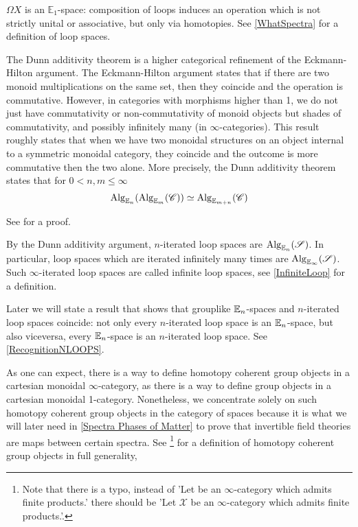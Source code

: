 \begin{ex}
    $\Omega X$ is an $\mathbb{E}_1$-space: composition of loops induces an operation which is not
    strictly unital or associative, but only via homotopies. See
    \ref{WhatSpectra} for a definition of loop spaces.
\end{ex}
\begin{thm}\label{DunnAdds}
    The Dunn additivity theorem is a higher categorical refinement of the Eckmann-Hilton argument.
    The Eckmann-Hilton argument states that if there are two monoid multiplications on the same set, then
    they coincide and the operation is commutative. However, in categories with morphisms higher than 1,
    we do not just have commutativity or non-commutativity of monoid objects but
     shades of
    commutativity, and possibly infinitely many (in $\infty$-categories). This result roughly states that
     when we have two monoidal structures on an object
    internal to a symmetric monoidal category, they coincide and the outcome is more commutative then
     the two alone. More
     precisely, the Dunn additivity theorem states
    that for $0< n,m\leq \infty$
    $$\operatorname{Alg}_{\mathbb{E}_n}(\operatorname{Alg}_{\mathbb{E}_m}(\mathscr{C}))\simeq \operatorname{Alg}_{\mathbb{E}_{m+n}}(\mathscr{C})$$
\end{thm}
See \cite[5.1.2.2]{Luriealgebra} for a proof.
\begin{ex}
    By the Dunn additivity argument, $n$-iterated loop spaces are $\operatorname{Alg}_{\mathbb{E}_n}(\mathscr{S})$.
    In particular, loop spaces which are iterated infinitely many times are 
    $\operatorname{Alg}_{\mathbb{E}_\infty}(\mathscr{S})$. Such $\infty$-iterated loop spaces are called infinite loop spaces, 
    see \ref{InfiniteLoop} for a definition.
    
  Later we will state a result that shows that grouplike $\mathbb{E}_n$-spaces and $n$-iterated loop spaces
   coincide:
  not only every $n$-iterated loop space is an $\mathbb{E}_n$-space, but also viceversa,
  every $\mathbb{E}_n$-space is an $n$-iterated loop space. See \ref{RecognitionNLOOPS}.
\end{ex}
As one can expect, there is a way to define homotopy coherent group objects in a cartesian monoidal
$\infty$-category, as there is a way to define group objects in a cartesian monoidal 1-category.
Nonetheless, we concentrate solely on such homotopy coherent group objects in the category of spaces because it is 
what we will later need in \ref{Spectra Phases of Matter} to prove that invertible field theories are maps
between certain spectra. See \cite[5.2.6.6]{Luriealgebra}\footnote{Note that there
     is a typo, instead of 'Let \cat be an $\infty$-category which admits finite products.' there should be
    'Let $\mathscr{X}$ be  an $\infty$-category which admits finite products.'.} for a definition of homotopy coherent group objects in full generality,
